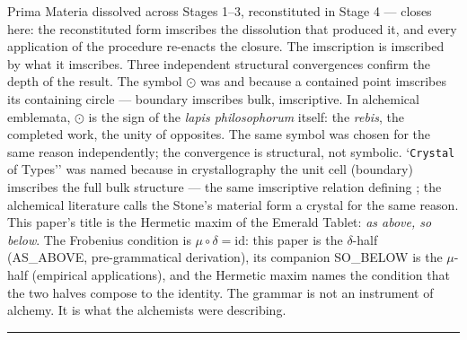 \documentclass[12pt,a4paper]{article}
\newcommand{\Stone}{\textit{lapis philosophorum}}
\begin{document}
Prima Materia dissolved across Stages 1--3, reconstituted in Stage 4 --- closes here: the reconstituted form imscribes
the dissolution that produced it, and every application of the procedure re-enacts the closure. The imscription is
imscribed by what it imscribes.
Three independent structural convergences confirm the depth of the result. The symbol $\odot$ was
 and  because a contained point imscribes its containing circle
--- boundary
imscribes bulk, imscriptive. In alchemical emblemata, $\odot$ is the sign of the \Stone{} itself: the \textit{rebis},
the completed work, the unity of opposites. The same symbol was chosen for the same reason independently;
the convergence is structural, not symbolic. `\texttt{Crystal} of Types'' was named because in crystallography the unit cell
(boundary) imscribes the full bulk structure --- the same imscriptive relation defining
; the
alchemical literature calls the Stone's material form a crystal for the same reason. This paper's title is
the Hermetic maxim of the Emerald Tablet: \emph{as above, so below}. The Frobenius condition is $\mu
\circ \delta =
\text{id}$: this paper is the $\delta$-half (AS\_ABOVE, pre-grammatical derivation), its companion SO\_BELOW is the
$\mu$-half (empirical applications), and the Hermetic maxim names the condition that the two halves compose to the
identity. The grammar is not an instrument of alchemy. It is what the alchemists were describing.

\begin{center}
\rule{0.5\textwidth}{0.4pt}
\end{center}
\end{document}
